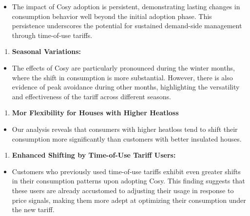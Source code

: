 \documentclass[
]{article}
\providecommand{\tightlist}{%
  \setlength{\itemsep}{0pt}\setlength{\parskip}{0pt}}
\begin{document}
\begin{itemize}
\tightlist
\item
  The impact of Cosy adoption is persistent, demonstrating lasting changes in consumption behavior well beyond the initial adoption phase. This persistence underscores the potential for sustained demand-side management through time-of-use tariffs.
\end{itemize}

\begin{enumerate}
\def\labelenumi{\arabic{enumi}.}
\setcounter{enumi}{2}
\tightlist
\item
  \textbf{Seasonal Variations:}
\end{enumerate}

\begin{itemize}
\tightlist
\item
  The effects of Cosy are particularly pronounced during the winter months, where the shift in consumption is more substantial. However, there is also evidence of peak avoidance during other months, highlighting the versatility and effectiveness of the tariff across different seasons.
\end{itemize}

\begin{enumerate}
\def\labelenumi{\arabic{enumi}.}
\setcounter{enumi}{3}
\tightlist
\item
  \textbf{Mor Flexibility for Houses with Higher Heatloss}
\end{enumerate}

\begin{itemize}
\tightlist
\item
  Our analysis reveals that consumers with higher heatloss tend to shift their consumption more significantly than customers with better insulated houses.
\end{itemize}

\begin{enumerate}
\def\labelenumi{\arabic{enumi}.}
\setcounter{enumi}{4}
\tightlist
\item
  \textbf{Enhanced Shifting by Time-of-Use Tariff Users:}
\end{enumerate}

\begin{itemize}
\tightlist
\item
  Customers who previously used time-of-use tariffs exhibit even greater shifts in their consumption patterns upon adopting Cosy. This finding suggests that these users are already accustomed to adjusting their usage in response to price signals, making them more adept at optimizing their consumption under the new tariff.
\end{itemize}
\end{document}
